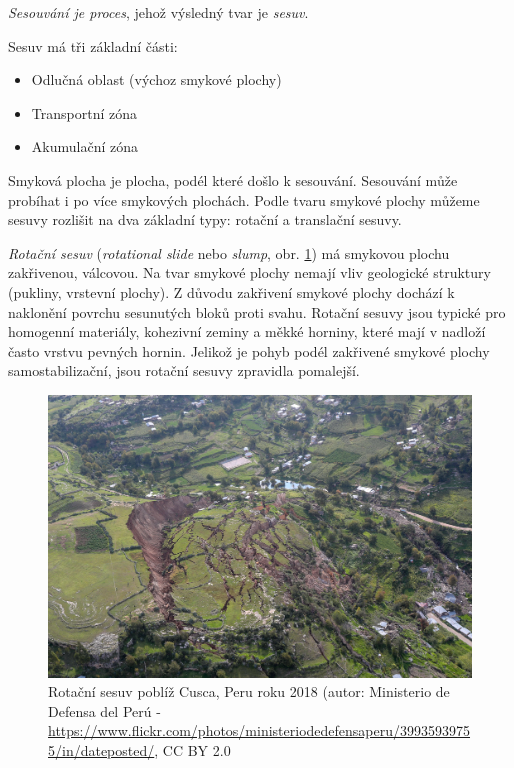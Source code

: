 \emph{Sesouvání je proces}, jehož výsledný tvar je \emph{sesuv}.

Sesuv má tři základní části: 
\begin{itemize}
	\item Odlučná oblast (výchoz smykové plochy)
	\item Transportní zóna
	\item Akumulační zóna
\end{itemize}

Smyková plocha je plocha, podél které došlo k sesouvání. Sesouvání může probíhat i po více smykových plochách. Podle tvaru smykové plochy můžeme sesuvy rozlišit na dva základní typy: rotační a translační sesuvy.

\emph{Rotační sesuv} (\textit{rotational slide} nebo \textit{slump}, obr. \ref{fig:rotacni}) má smykovou plochu zakřivenou, válcovou. Na tvar smykové plochy nemají vliv geologické struktury (pukliny, vrstevní plochy). Z důvodu zakřivení smykové plochy dochází k naklonění povrchu sesunutých bloků proti svahu. Rotační sesuvy jsou typické pro homogenní materiály, kohezivní zeminy a měkké horniny, které mají v nadloží často vrstvu pevných hornin. Jelikož je pohyb podél zakřivené smykové plochy samostabilizační, jsou rotační sesuvy zpravidla pomalejší.

\begin{figure}[h]
	\centering
	\includegraphics[width=1\linewidth]{obrazky/slope/rotacni}
	\caption{Rotační sesuv poblíž Cusca, Peru  roku 2018 (autor: Ministerio de Defensa del Perú - \url{https://www.flickr.com/photos/ministeriodedefensaperu/39935939755/in/dateposted/}, CC BY 2.0}
	\label{fig:rotacni}
\end{figure}



